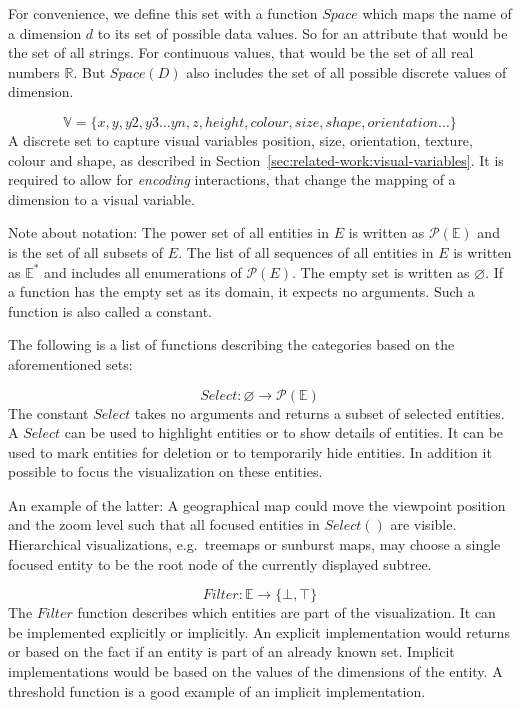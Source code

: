   For convenience, we define this set with a function $Space$ which maps the name of a dimension $d$ to its set of possible data values.
  So for an attribute  that would be the set of all strings.
  For continuous values, that would be the set of all real numbers $\mathbb{R}$.
  But $Space(D)$ also includes the set of all possible discrete values of dimension. 

\begin{equation} \mathbb{V} = \{x,y,y2,y3\ldots{}yn,z,height,colour,size,shape,orientation\ldots{}\} \end{equation}
  A discrete set to capture visual variables position, size, orientation, texture, colour and shape, as described in Section~\ref{sec:related-work:visual-variables}.
  It is required to allow for \emph{encoding} interactions, that change the mapping of a dimension to a visual variable.

Note about notation:
The power set of all entities in $E$ is written as $ \mathcal{P}(\mathbb{E})$ and is the set of all subsets of $E$.
The list of all sequences of all entities in $E$ is written as $ \mathbb{E^*} $ and includes all enumerations of $\mathcal{P}(E)$.
The empty set is written as $\varnothing$.
If a function has the empty set as its domain, it expects no arguments.
Such a function is also called a constant.

The following is a list of functions describing the categories based on the aforementioned sets:

\begin{equation} Select: \varnothing \rightarrow \mathcal{P}(\mathbb{E}) \end{equation}
  The constant $Select$ takes no arguments and returns a subset of selected entities.
  A $Select$ can be used to highlight entities or to show details of entities.
  It can be used to mark entities for deletion or to temporarily hide entities.
  In addition it possible to focus the visualization on these entities.

  An example of the latter:
  A geographical map could move the viewpoint position and the zoom level such that all focused entities in $Select()$ are visible.
  Hierarchical visualizations, e.g.\ treemaps or sunburst maps, may choose a single focused entity to be the root node of the currently displayed subtree.

\begin{equation} Filter: \mathbb{E} \rightarrow \{ \bot, \top \} \end{equation}
  The $Filter$ function describes which entities are part of the visualization.
  It can be implemented explicitly or implicitly.
  An explicit implementation would returns  or  based on the fact if an entity is part of an already known set.
  Implicit implementations would be based on the values of the dimensions of the entity.
  A threshold function is a good example of an implicit implementation.

